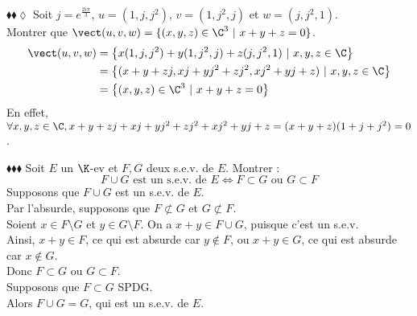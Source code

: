 \documentclass[11pt]{article}
\begin{document}
\begin{exercice}{$\blacklozenge\blacklozenge\lozenge$}{}
    Soit $j = e^{\frac{2i\pi}{3}}$, $u=(1,j,j^2)$, $v=(1,j^2,j)$ et $w=(j,j^2,1)$.\\
    Montrer que $\vect(u,v,w)=\{(x,y,z) \in \C^3 ~ | ~ x + y + z = 0\}$.
    \tcblower
    \begin{align*}
        \vect(u,v,w) &= \left\{x(1,j,j^2) + y(1,j^2,j) + z(j,j^2,1) ~ | ~ x,y,z \in \C\right\}\\
        &= \left\{(x + y + zj, xj + yj^2 + zj^2, xj^2 + yj + z) ~ | ~ x,y,z \in \C\right\}\\
        &= \left\{(x, y ,z) \in \C^3~ | ~ x + y + z = 0\right\}
    \end{align*}
    En effet, $\forall x, y, z \in \C, x + y + zj + xj + yj^2 + zj^2 + xj^2 + yj + z = (x + y + z)(1 + j + j^2) = 0$.
\end{exercice}

\begin{exercice}{$\blacklozenge\blacklozenge\blacklozenge$}{}
    Soit $E$ un $\K$-ev et $F,G$ deux s.e.v. de $E$. Montrer :
    \begin{equation*} F \cup G \text{ est un s.e.v. de } E \iff F \subset G \text{ ou } G \subset F\end{equation*}
    \tcblower
    \fbox{$\Rightarrow$} Supposons que $F \cup G$ est un s.e.v. de $E$.\\
    Par l'absurde, supposons que $F \not\subset G$ et $G \not\subset F$.\\
    Soient $x \in F \setminus G$ et $y \in G \setminus F$. 
    On a $x + y \in F \cup G$, puisque c'est un s.e.v.\\
    Ainsi, $x+y\in F$, ce qui est absurde car $y \notin F$, ou $x + y \in G$, ce qui est absurde car $x \notin G$.\\
    Donc $F \subset G$ ou $G \subset F$.\\[0.3cm]
    \fbox{$\Leftarrow$} Supposons que $F \subset G$ SPDG.\\
    Alors $F \cup G = G$, qui est un s.e.v. de $E$.
\end{exercice}
\end{document}
